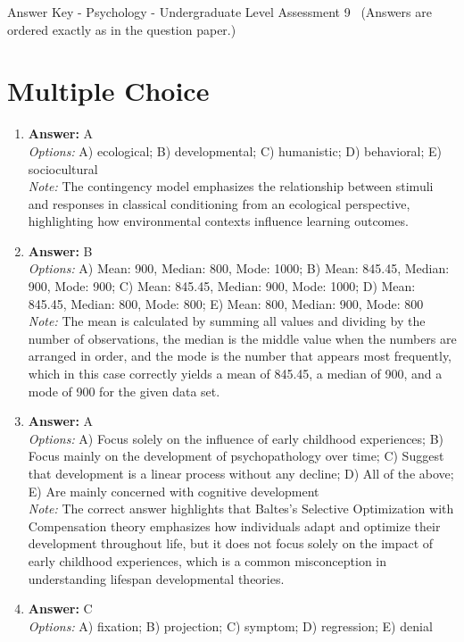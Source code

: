 \documentclass[12pt]{article}
\begin{document}
\begin{center}
Answer Key - Psychology - Undergraduate Level Assessment 9 \
\small (Answers are ordered exactly as in the question paper.)
\end{center}

\section*{Multiple Choice}
\begin{enumerate}[label=\arabic*.]
\item \textbf{Answer:} A
\\ \textit{Options:} A) ecological; B) developmental; C) humanistic; D) behavioral; E) sociocultural
\\ \textit{Note:} The contingency model emphasizes the relationship between stimuli and responses in classical conditioning from an ecological perspective, highlighting how environmental contexts influence learning outcomes.
\item \textbf{Answer:} B
\\ \textit{Options:} A) Mean: 900, Median: 800, Mode: 1000; B) Mean: 845.45, Median: 900, Mode: 900; C) Mean: 845.45, Median: 900, Mode: 1000; D) Mean: 845.45, Median: 800, Mode: 800; E) Mean: 800, Median: 900, Mode: 800
\\ \textit{Note:} The mean is calculated by summing all values and dividing by the number of observations, the median is the middle value when the numbers are arranged in order, and the mode is the number that appears most frequently, which in this case correctly yields a mean of 845.45, a median of 900, and a mode of 900 for the given data set.
\item \textbf{Answer:} A
\\ \textit{Options:} A) Focus solely on the influence of early childhood experiences; B) Focus mainly on the development of psychopathology over time; C) Suggest that development is a linear process without any decline; D) All of the above; E) Are mainly concerned with cognitive development
\\ \textit{Note:} The correct answer highlights that Baltes's Selective Optimization with Compensation theory emphasizes how individuals adapt and optimize their development throughout life, but it does not focus solely on the impact of early childhood experiences, which is a common misconception in understanding lifespan developmental theories.
\item \textbf{Answer:} C
\\ \textit{Options:} A) fixation; B) projection; C) symptom; D) regression; E) denial

\end{enumerate}
\end{document}
